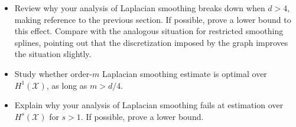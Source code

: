 \documentclass{article}
\newcommand{\1}{\mathbf{1}}
\newcommand{\mc}[1]{\mathcal{#1}}
\theoremstyle{alden}
\theoremstyle{aldenthm}
\theoremstyle{definition}
\theoremstyle{remark}
\begin{document}
\begin{itemize}
	\item Review why your analysis of Laplacian smoothing breaks down when $d > 4$, making reference to the previous section. If possible, prove a lower bound to this effect. Compare with the analogous situation for restricted smoothing splines, pointing out that the discretization imposed by the graph improves the situation slightly.
	\item Study whether order-$m$ Laplacian smoothing estimate is optimal over $H^1(\mc{X})$, as long as $m > d/4$. 
	\item Explain why your analysis of Laplacian smoothing fails at estimation over $H^s(\mc{X})$ for $s > 1$. If possible, prove a lower bound.
\end{itemize}
\end{document}
